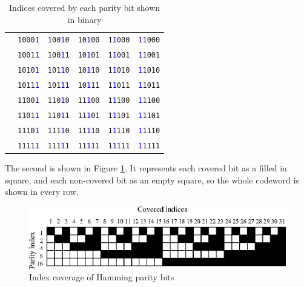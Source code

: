 \documentclass{article}
\begin{document}
\begin{table}[h]
\begin{center}
\begin{tabular}{l|rrrrr}
    & \texttt{1000\textcolor{blue}{1}} & \texttt{100\textcolor{blue}{1}0} & \texttt{10\textcolor{blue}{1}00} & \texttt{1\textcolor{blue}{1}000} & \texttt{\textcolor{blue}{1}1000} \\
    & \texttt{1001\textcolor{blue}{1}} & \texttt{100\textcolor{blue}{1}1} & \texttt{10\textcolor{blue}{1}01} & \texttt{1\textcolor{blue}{1}001} & \texttt{\textcolor{blue}{1}1001} \\
    & \texttt{1010\textcolor{blue}{1}} & \texttt{101\textcolor{blue}{1}0} & \texttt{10\textcolor{blue}{1}10} & \texttt{1\textcolor{blue}{1}010} & \texttt{\textcolor{blue}{1}1010} \\
    & \texttt{1011\textcolor{blue}{1}} & \texttt{101\textcolor{blue}{1}1} & \texttt{10\textcolor{blue}{1}11} & \texttt{1\textcolor{blue}{1}011} & \texttt{\textcolor{blue}{1}1011} \\
    & \texttt{1100\textcolor{blue}{1}} & \texttt{110\textcolor{blue}{1}0} & \texttt{11\textcolor{blue}{1}00} & \texttt{1\textcolor{blue}{1}100} & \texttt{\textcolor{blue}{1}1100} \\
    & \texttt{1101\textcolor{blue}{1}} & \texttt{110\textcolor{blue}{1}1} & \texttt{11\textcolor{blue}{1}01} & \texttt{1\textcolor{blue}{1}101} & \texttt{\textcolor{blue}{1}1101} \\
    & \texttt{1110\textcolor{blue}{1}} & \texttt{111\textcolor{blue}{1}0} & \texttt{11\textcolor{blue}{1}10} & \texttt{1\textcolor{blue}{1}110} & \texttt{\textcolor{blue}{1}1110} \\
    & \texttt{1111\textcolor{blue}{1}} & \texttt{111\textcolor{blue}{1}1} & \texttt{11\textcolor{blue}{1}11} & \texttt{1\textcolor{blue}{1}111} & \texttt{\textcolor{blue}{1}1111} \\
    \bottomrule
    \end{tabular}
    \caption{Indices covered by each parity bit shown in binary}\label{tab:hamming-binary}
\end{center}
\end{table}

    The second is shown in Figure \ref{fig:hamming}. It represents each covered
    bit as a filled in square, and each non-covered bit as an empty square, so
    the whole codeword is shown in every row.

\begin{figure}[h]
\begin{center}
\includegraphics{../psfiles/hamming_visualisation.eps}
\end{center}
\caption{Index coverage of Hamming parity bits}\label{fig:hamming}
\end{figure}
\end{document}
